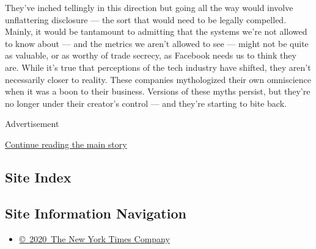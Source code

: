 They've inched tellingly in this direction but going all the way would
involve unflattering disclosure --- the sort that would need to be
legally compelled. Mainly, it would be tantamount to admitting that the
systems we're not allowed to know about --- and the metrics we aren't
allowed to see --- might not be quite as valuable, or as worthy of trade
secrecy, as Facebook needs us to think they are. While it's true that
perceptions of the tech industry have shifted, they aren't necessarily
closer to reality. These companies mythologized their own omniscience
when it was a boon to their business. Versions of these myths persist,
but they're no longer under their creator's control --- and they're
starting to bite back.

Advertisement

\protect\hyperlink{after-bottom}{Continue reading the main story}

\hypertarget{site-index}{%
\subsection{Site Index}\label{site-index}}

\hypertarget{site-information-navigation}{%
\subsection{Site Information
Navigation}\label{site-information-navigation}}

\begin{itemize}
\tightlist
\item
  \href{https://help.nytimes3xbfgragh.onion/hc/en-us/articles/115014792127-Copyright-notice}{©~2020~The
  New York Times Company}
\end{itemize}

